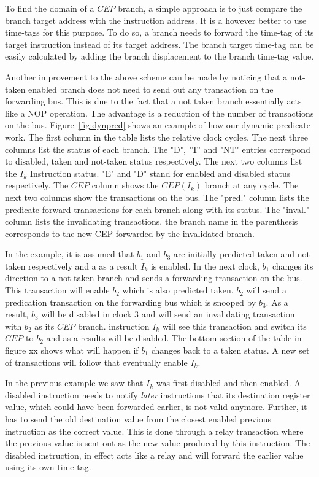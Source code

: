 \documentclass[10pt,twocolumn]{IEEEtran}
\begin{document}
To find the domain of a $CEP$ branch, a simple approach is to just
compare the branch target address with the instruction address.  It is
a however better to use time-tags for this purpose.  To do so, a branch
needs to forward the time-tag of its target instruction instead of its
target address. The branch target time-tag can be easily calculated by
adding the branch displacement to the branch time-tag value.

Another improvement to the above scheme can be made by noticing that a
not-taken enabled branch does not need to send out any transaction on
the forwarding bus.  This is due to the fact that a not taken branch
essentially acts like a NOP operation.  The advantage is a reduction of
the number of transactions on the bus.  Figure~\ref{fig:dynpred} shows
an example of how our dynamic predicate work.  The first column in the
table lists the relative clock cycles.  The next three columns list the
status of each branch.  The "D", "T' and "NT" entries correspond to
disabled, taken and not-taken status respectively.  The next two
columns list the $I_k$ Instruction status.  "E" and "D" stand for
enabled and disabled status respectively.  The $CEP$ column shows the
$CEP(I_k)$ branch at any cycle.  The next two columns show the
transactions on the bus.  The "pred." column lists the predicate
forward transactions for each branch along with its status.  The
"inval." column lists the invalidating transactions.  the branch name
in the parenthesis corresponds to the new CEP forwarded by the
invalidated branch.

In the example, it is assumed that $b_1$ and $b_3$ are initially
predicted taken and not-taken respectively and a as a result $I_k$ is
enabled.  In the next clock, $b_1$ changes its direction to a not-taken
branch and sends a forwarding transaction on the bus.  This transaction
will enable $b_2$ which is also predicted taken.  $b_2$ will send a
predication transaction on the forwarding bus which is snooped by
$b_3$.  As a result, $b_3$ will be disabled in clock 3 and will send an
invalidating transaction with $b_2$ as its $CEP$ branch.  instruction
$I_k$ will see this transaction and switch its $CEP$ to $b_2$ and as a
results will be disabled.  The bottom section of the table in figure xx
shows what will happen if $b_1$ changes back to a taken status.  A new
set of transactions will follow that eventually enable $I_k$.

In the previous example we saw that $I_k$ was first disabled and then
enabled.  A disabled instruction needs to notify \emph{later}
instructions that its destination register value, which could have been
forwarded earlier, is not valid anymore.  Further, it has to send the
old destination value from the closest enabled previous instruction as
the correct value.  This is done through a relay transaction where the
previous value is sent out as the new value produced by this
instruction.  The disabled instruction, in effect acts like a relay and
will forward the earlier value using its own time-tag.
\end{document}
